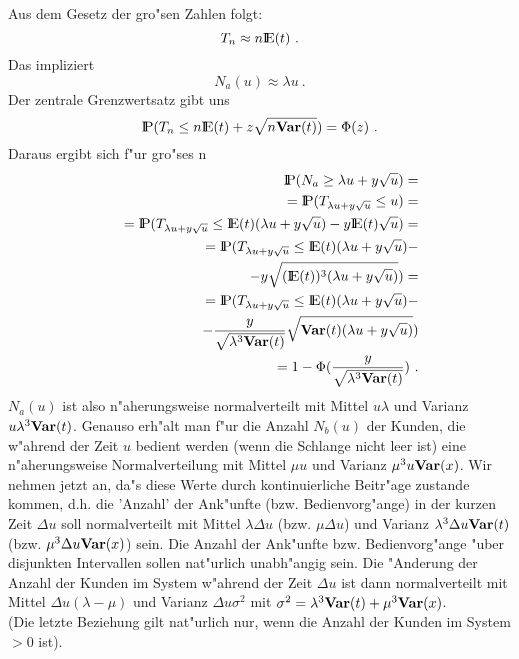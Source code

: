 \begin{enumerate}
Aus dem Gesetz der gro"sen Zahlen folgt:
\[ T_{n} \approx n{\rm I\kern-0.2em E}(t) ~.\]
Das impliziert
\[N_{a}(u) \approx \lambda u ~. \]
Der zentrale Grenzwertsatz gibt uns
\[{\rm I\kern-0.2em P}(T_{n} \leq n{\rm I\kern-0.2em E}(t)+z\sqrt{n{\bf Var}(t)}) = \Phi (z) ~.   \]
Daraus ergibt sich f"ur gro"ses n
\begin{eqnarray*}
& &{\rm I\kern-0.2em P}(N_{a}\geq\lambda u + y\sqrt{u}) = \\ 
& & ~ ~={\rm I\kern-0.2em P}(T_{\lambda u + y\sqrt{u}} \leq u) = \\
& & ~ ~={\rm I\kern-0.2em P}(T_{\lambda u + y\sqrt{u}} \leq {\rm I\kern-0.2em E}(t)(\lambda u + y\sqrt{u}) - y{\rm I\kern-0.2em E}(t)\sqrt{u} ) = \\
& & ~ ~={\rm I\kern-0.2em P}(T_{\lambda u + y\sqrt{u}} \leq {\rm I\kern-0.2em E}(t)(\lambda u + y\sqrt{u}) - \\
& & ~ ~ ~ ~ ~- y\sqrt{({\rm I\kern-0.2em E}(t))^{3}(\lambda u + y\sqrt{u})})=\\
& &~ ~={\rm I\kern-0.2em P}(T_{\lambda u + y\sqrt{u}} \leq {\rm I\kern-0.2em E}(t)(\lambda u + y\sqrt{u}) - \\
& & ~ ~ ~ ~ ~-\frac{y}{\sqrt{\lambda ^{3}{\bf Var}(t)}}\sqrt{{\bf Var}(t)(\lambda u + y\sqrt{u})}) \\
& &~ ~=1 - \Phi(\frac{y}{\sqrt{\lambda ^{3}{\bf Var}(t)}}) ~.
\end{eqnarray*}
$N_{a}(u)$ ist also n"aherungsweise normalverteilt mit Mittel $u\lambda$ und Varianz $u\lambda^{3}{\bf Var}(t)$. Genauso erh"alt man f"ur die Anzahl $N_{b}(u)$
der
Kunden, die w"ahrend der Zeit $u$ bedient werden (wenn die Schlange nicht leer ist) eine n"aherungsweise Normalverteilung mit Mittel $\mu u$ und Varianz
$\mu^{3}u{\bf Var}(x)$. Wir nehmen jetzt an, da"s diese Werte durch kontinuierliche Beitr"age zustande kommen, d.h. die 'Anzahl' der Ank"unfte (bzw.
Bedienvorg"ange)
in der kurzen Zeit $\Delta u$ soll normalverteilt mit Mittel $\lambda\Delta u$ (bzw. $\mu\Delta u$) und Varianz $\lambda^{3}\Delta u{\bf Var}(t)$ (bzw.
$\mu^{3}\Delta
u{\bf Var}(x)$) sein. Die Anzahl der Ank"unfte bzw. Bedienvorg"ange "uber disjunkten Intervallen sollen nat"urlich unabh"angig sein. Die "Anderung der Anzahl der
Kunden
im System w"ahrend der Zeit $\Delta u$ ist dann normalverteilt mit Mittel $\Delta u(\lambda - \mu)$ und Varianz $\Delta u\sigma^{2}$ mit $\sigma^{2} =
\lambda^{3}{\bf Var}(t) + \mu^{3}{\bf Var}(x)$.\\
(Die letzte Beziehung gilt nat"urlich nur, wenn die Anzahl der Kunden im System $> 0$ ist).


\end{enumerate}
